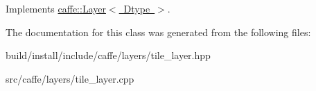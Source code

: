 Implements \mbox{\hyperlink{classcaffe_1_1_layer_a7fe981e8af8d93d587acf2a952be563d}{caffe\+::\+Layer$<$ Dtype $>$}}.



The documentation for this class was generated from the following files\+:\begin{DoxyCompactItemize}
\item 
build/install/include/caffe/layers/tile\+\_\+layer.\+hpp\item 
src/caffe/layers/tile\+\_\+layer.\+cpp\end{DoxyCompactItemize}
